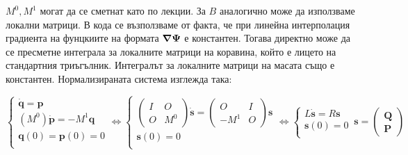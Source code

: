 \documentclass[bulgarian, 12pt]{article}
\begin{document}
\begin{large}
$M^0, M^1$ могат да се сметнат като по лекции. За $B$ аналогично може да използваме локални матрици.
В кода се възползваме от факта, че при линейна интерполация градиента на фунцкиите на формата $\grad \boldsymbol{\Psi}$ е константен. 
Тогава директно може да се пресметне интеграла за локалните матрици на коравина, който е лицето на стандартния триъгълник.
Интегралът за локалните матрици на масата също е константен.
Нормализираната система изглежда така:
\begin{comment}
	\begin{cases}
		\dot{\mathbf{s}} = 
			\left(\begin{array}{c|c}
			O & I \\ \hline
			-(M^0)^{-1} M^1 & O
		\end{array}\right) \mathbf{s} = 
		A \mathbf{s}\\
		\mathbf{s}(0) = 0 \\
	\end{cases},
\end{comment}
\begin{equation*}
    \begin{cases}
      \dot {\mathbf{q}} = {\mathbf{p}} \\
      (M^0) \dot {\mathbf{p}} = -M^1 {\mathbf{q}} \\
      \mathbf{q}(0) = \mathbf{p}(0) = 0 \\
    \end{cases}
	\iff
	\begin{cases}
		\left(\begin{array}{c|c}
			I & O \\ \hline
			O & M^0
		\end{array}\right)\dot{\mathbf{s}} = 
			\left(\begin{array}{c|c}
			O & I \\ \hline
			-M^1 & O
		\end{array}\right) \mathbf{s} \\
		\mathbf{s}(0) = 0 \\
	\end{cases}\iff
	\begin{cases}
		L\dot{\mathbf{s}} = 
		R \mathbf{s} \\
		\mathbf{s}(0) = 0 \\
	\end{cases}\, 
	\mathbf{s} = 
		\left(\begin{array}{c}
			\mathbf{Q} \\ \hline
			\mathbf{P}
		\end{array}\right)

\end{equation*}
\end{large}
\end{document}
